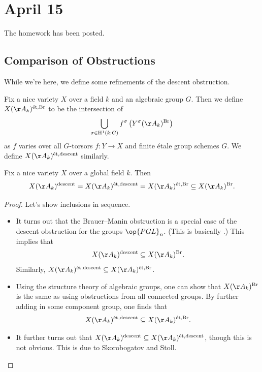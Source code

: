 \documentclass[../notes.tex]{subfiles}
\begin{document}
\section{April 15}
The homework has been posted.

\subsection{Comparison of Obstructions}
While we're here, we define some refinements of the descent obstruction.
\begin{notation}
	Fix a nice variety $X$ over a field $k$ and an algebraic group $G$. Then we define $X(\AA_k)^{\mathrm{\acute et},\mathrm{Br}}$ to be the intersection of
	\[\bigcup_{\sigma\in\mathrm H^1(k;G)}f^\sigma\left(Y^\sigma(\AA_k)^{\mathrm{Br}}\right)\]
	as $f$ varies over all $G$-torsors $f\colon Y\to X$ and finite \'etale group schemes $G$. We define $X(\AA_k)^{\mathrm{\acute et},\mathrm{descent}}$ similarly.
\end{notation}
\begin{proposition} \label{prop:descent-is-et-br}
	Fix a nice variety $X$ over a global field $k$. Then
	\[X(\AA_k)^{\mathrm{descent}}=X(\AA_k)^{\mathrm{\acute et},\mathrm{descent}}=X(\AA_k)^{\mathrm{\acute et},\mathrm{Br}}\subseteq X(\AA_k)^{\mathrm{Br}}.\]
\end{proposition}
\begin{proof}
	Let's show inclusions in sequence.
	\begin{itemize}
		\item It turns out that the Brauer--Manin obstruction is a special case of the descent obstruction for the groups $\op{PGL}_n$. (This is basically .) This implies that
		\[X(\AA_k)^{\mathrm{descent}}\subseteq X(\AA_k)^{\mathrm{Br}}.\]
		Similarly, $X(\AA_k)^{\mathrm{\acute et},\mathrm{descent}}\subseteq X(\AA_k)^{\mathrm{\acute et},\mathrm{Br}}$.
		\item Using the structure theory of algebraic groups, one can show that $X(\AA_k)^{\mathrm{Br}}$ is the same as using obstructions from all connected groups. By further adding in some component group, one finds that
		\[X(\AA_k)^{\mathrm{\acute et},\mathrm{descent}}\subseteq X(\AA_k)^{\mathrm{\acute et},\mathrm{Br}}.\]
		\item It further turns out that $X(\AA_k)^{\mathrm{descent}}\subseteq X(\AA_k)^{\mathrm{\acute et},\mathrm{descent}}$, though this is not obvious. This is due to Skorobogatov and Stoll.
		\qedhere
	\end{itemize}
\end{proof}
\end{document}
